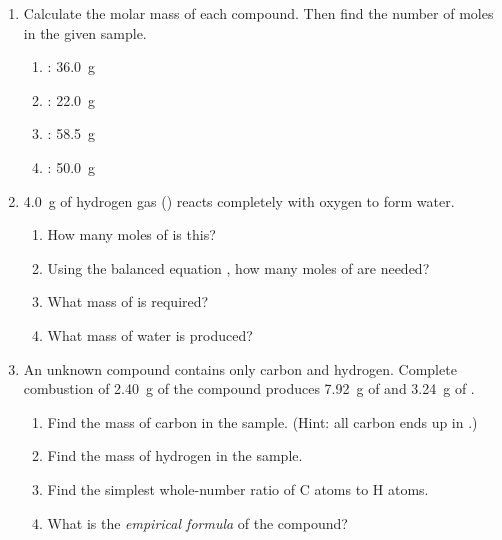 \documentclass[12pt, a4paper]{book}
\theoremstyle{definition}
\begin{document}
\begin{problembox}
\begin{enumerate}[label=\textbf{\arabic*.}]
  \item Calculate the molar mass of each compound.
        Then find the number of moles in the given sample.
        \begin{enumerate}[label=(\alph*)]
          \item {}: \SI{36.0}{\gram}
          \item {}: \SI{22.0}{\gram}
          \item {}: \SI{58.5}{\gram}
          \item {}: \SI{50.0}{\gram}
        \end{enumerate}

  \item \SI{4.0}{\gram} of hydrogen gas () reacts
        completely with oxygen to form water.
        \begin{enumerate}[label=(\alph*)]
          \item How many moles of  is this?
          \item Using the balanced equation
                ,
                how many moles of  are needed?
          \item What mass of  is required?
          \item What mass of water is produced?
        \end{enumerate}

  \item An unknown compound contains only carbon and hydrogen.
        Complete combustion of \SI{2.40}{\gram} of the compound
        produces \SI{7.92}{\gram} of  and
        \SI{3.24}{\gram} of .
        \begin{enumerate}[label=(\alph*)]
          \item Find the mass of carbon in the sample.
                (Hint: all carbon ends up in .)
          \item Find the mass of hydrogen in the sample.
          \item Find the simplest whole-number ratio of
                C atoms to H atoms.
          \item What is the \emph{empirical formula} of
                the compound?
        \end{enumerate}
\end{enumerate}
\end{problembox}
\end{document}
